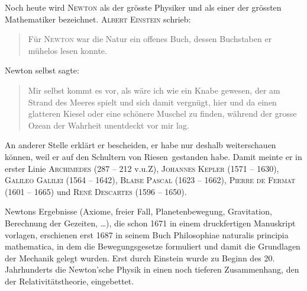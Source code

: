 \documentclass[%
<<<<<<< Updated upstream
11pt,%
twoside,%
titlepage,%
german,%
=======
11pt,%
twoside,%
titlepage,%
swissgerman,%
>>>>>>> Stashed changes
headsepline%
]{scrartcl}
\theoremstyle{definition}
\theoremstyle{plain}
\begin{document}
Noch heute wird \textsc{Newton} als der grösste Physiker und als einer der grössten Mathematiker bezeichnet. \textsc{Albert Einstein} schrieb:
\begin{quote}
\glqq Für \textsc{Newton} war die Natur ein offenes Buch, dessen Buchstaben er mühelos lesen konnte.\grqq
\end{quote}
Newton selbst sagte: 
\begin{quote}
\glqq Mir selbst kommt es vor, als wäre ich wie ein Knabe gewesen, der am Strand des Meeres spielt und sich damit vergnügt, hier und da einen glatteren Kiesel oder eine schönere Muschel zu finden, während der grosse Ozean der Wahrheit unentdeckt vor mir lag.\grqq
\end{quote}
An anderer Stelle erklärt er bescheiden, er habe nur deshalb weiterschauen können, weil er auf den \glqq Schultern von Riesen\grqq\ gestanden habe. Damit meinte er in erster Linie \textsc{Archimedes} (287 -- 212 v.u.Z), \textsc{Johannes Kepler} (1571 -- 1630), \textsc{Galileo Galilei} (1564 -- 1642), \textsc{Blaise Pascal} (1623 -- 1662), \textsc{Pierre de Fermat} (1601 -- 1665) und \textsc{Ren\'e Descartes} (1596 -- 1650).

Newtons Ergebnisse (Axiome, freier Fall, Planetenbewegung, Gravitation, Berechnung der Gezeiten, \dots), die schon 1671 in einem druckfertigen Manuskript vorlagen, erschienen erst 1687 in seinem Buch \glqq Philosophiae naturalis principia mathematica\grqq, in dem die Bewegungsgesetze formuliert und damit die Grundlagen der Mechanik gelegt wurden. Erst durch Einstein wurde zu Beginn des 20. Jahrhunderts die Newton'sche Physik in einen noch tieferen Zusammenhang, den der Relativitätstheorie, eingebettet.
\end{document}
